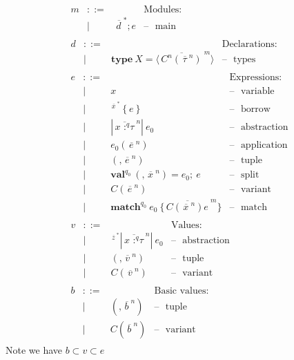 \[\begin{array}{r}
\begin{array}{llll}
m & ::= & & \text{Modules}: \\
 & | & {{\overline{\, d\:}}^{\ast};e} & \text{– }\text{ main }
\end{array} \\
\begin{array}{llll}
d & ::= & & \text{Declarations}: \\
 & | & {\mathsf{\mathbf{\text{type}}}\ X = \langle{\overline{\, C^{n}\left( {\overline{\,\tau\:}}^{n} \right)\:}}^{m}\rangle} & \text{– }\text{ types}
\end{array} \\
\begin{array}{llll}
e & ::= & & \text{Expressions}: \\
 & | & x & \text{– }\text{ variable} \\
 & | & {{}^{{\overline{\, x\:}}^{\ast}}\left\{ e \right\}} & \text{– }\text{ borrow} \\
 & | & {|{\overline{\,{x\text{ :}^{q}\tau}\:}}^{n}|\ e_{0}} & \text{– }\text{ abstraction} \\
 & | & {e_{0}({\overline{\, e\:}}^{n})} & \text{– }\text{ application} \\
 & | & {(,{\overline{\, e\:}}^{n})} & \text{– }\text{ tuple} \\
 & | & {\mathsf{\mathbf{\text{val}}}^{q_{0}}\ {(,{\overline{\, x\:}}^{n})} = e_{0};\ e} & \text{– }\text{ split} \\
 & | & {C({\overline{\, e\:}}^{n})} & \text{– }\text{ variant} \\
 & | & {\mathsf{\mathbf{\text{match}}}^{q_{0}}\ e_{0}\ \{{\overline{\,{C({\overline{\, x\:}}^{n})}e\:}}^{m}\}} & \text{– }\text{ match}
\end{array} \\
\begin{array}{llll}
v & ::= & & \text{Values}: \\
 & | & {{{}^{{\overline{\, z\:}}^{\ast}}{|{\overline{\,{x\text{ :}^{q}\tau}\:}}^{n}|}}\ e_{0}} & \text{– }\text{ abstraction} \\
 & | & {(,{\overline{\, v\:}}^{n})} & \text{– }\text{ tuple} \\
 & | & {C({\overline{\, v\:}}^{n})} & \text{– }\text{ variant}
\end{array} \\
\begin{array}{llll}
b & ::= & & \text{Basic values}: \\
 & | & {(,{\overline{\, b\:}}^{n})} & \text{– }\text{ tuple} \\
 & | & {C({\overline{\, b\:}}^{n})} & \text{– }\text{ variant}
\end{array}
\end{array}\] Note we have \(b \subset v \subset e\)

